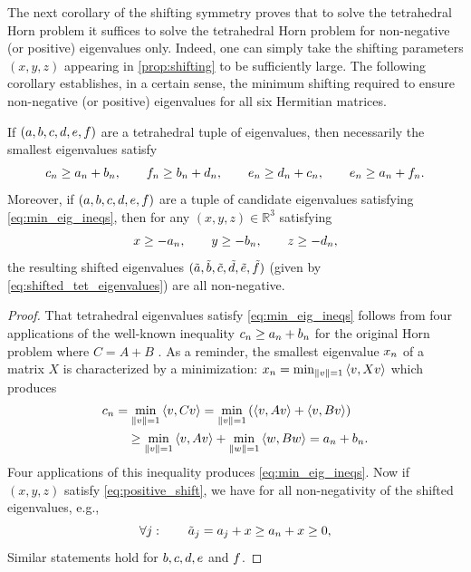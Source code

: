 \documentclass[notitlepage, 11pt, letterpaper]{amsart}
\begin{document}
The next corollary of the shifting symmetry proves that to solve the tetrahedral Horn problem it suffices to solve the tetrahedral Horn problem for non-negative (or positive) eigenvalues only.
Indeed, one can simply take the shifting parameters $(x,y,z)$ appearing in \cref{prop:shifting} to be sufficiently large.
The following corollary establishes, in a certain sense, the minimum shifting required to ensure non-negative (or positive) eigenvalues for all six Hermitian matrices.
\begin{cor}
    \label{cor:psd}
    If $(a, b, c, d, e, f)$ are a tetrahedral tuple of eigenvalues, then necessarily the smallest eigenvalues satisfy
    \begin{equation}
        \label{eq:min_eig_ineqs}
        c_n \geq a_n + b_n, \qquad f_n \geq b_n + d_n, \qquad e_n \geq d_n + c_n, \qquad e_n \geq a_n + f_n.
    \end{equation}
    Moreover, if $(a, b, c, d, e, f)$ are a tuple of candidate eigenvalues satisfying \cref{eq:min_eig_ineqs}, then for any $(x,y,z) \in \mathbb R^{3}$ satisfying
    \begin{equation}
        \label{eq:positive_shift}
        x \geq -a_n, \qquad
        y \geq -b_n, \qquad
        z \geq -d_n,
    \end{equation}
    the resulting shifted eigenvalues $(\tilde {a}, \tilde {b}, \tilde {c}, \tilde {d}, \tilde {e}, \tilde {f})$ (given by \cref{eq:shifted_tet_eigenvalues}) are all non-negative.
\end{cor}
\begin{proof}
    That tetrahedral eigenvalues satisfy \cref{eq:min_eig_ineqs} follows from four applications of the well-known inequality $c_n \geq a_n + b_n$ for the original Horn problem where $C=A+B$ \cite{bhatia2001linear}.
    As a reminder, the smallest eigenvalue $x_n$ of a matrix $X$ is characterized by a minimization: $x_n = \min_{\left\lVert v\right\rVert = 1} \braket{v, Xv}$ which produces
    \begin{align}
        \begin{split}
            &c_n = \min_{\left\lVert v\right\rVert = 1} \braket{v, C v} = \min_{\left\lVert v\right\rVert = 1} \left(\braket{v, A v} + \braket{v, B v}\right) \\
            &\qquad \geq \min_{\left\lVert v\right\rVert = 1} \braket{v, A v} + \min_{\left\lVert w\right\rVert = 1}\braket{w, B w} = a_n + b_n.
        \end{split}
    \end{align}
    Four applications of this inequality produces \cref{eq:min_eig_ineqs}.
    Now if $(x,y,z)$ satisfy \cref{eq:positive_shift}, we have for all non-negativity of the shifted eigenvalues, e.g.,
    \begin{equation}
        \forall j : \qquad \tilde {a}_j = a_j + x \geq a_n + x \geq 0,
    \end{equation}
    Similar statements hold for $b,c,d, e$ and $f$.
\end{proof}
\end{document}
